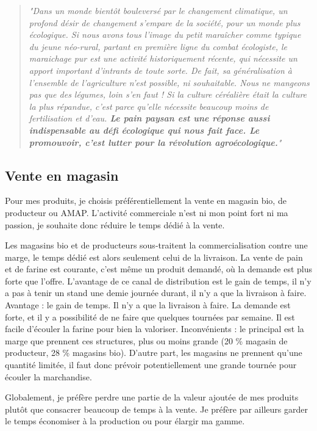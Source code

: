 \documentclass{book}
\begin{document}
\begin{quote}

\textit{"Dans un monde bientôt bouleversé par le changement climatique, un profond désir de changement s’empare de la société, pour un monde plus écologique. Si nous avons tous l’image du petit maraîcher comme typique du jeune néo-rural, partant en première ligne du combat écologiste, le maraichage pur est une activité historiquement récente, qui nécessite un apport important d’intrants de toute sorte. De fait, sa généralisation à l’ensemble de l’agriculture n’est possible, ni souhaitable. Nous ne mangeons pas que des légumes, loin s’en faut ! Si la culture céréalière était la culture la plus répandue, c’est parce qu’elle nécessite beaucoup moins de fertilisation et d’eau. \textbf{Le pain paysan est une réponse aussi indispensable au défi écologique qui nous fait face. Le promouvoir, c'est lutter pour la révolution agroécologique.}"}

\end{quote}

\subsection{Vente en magasin}

Pour mes produits, je choisis préférentiellement la vente en magasin bio, de producteur ou AMAP. L’activité commerciale n’est ni mon point fort ni ma passion, je souhaite donc réduire le temps dédié à la vente. 

Les magasins bio et de producteurs sous-traitent la commercialisation contre une marge, le temps dédié est alors seulement celui de la livraison. La vente de pain et de farine est courante, c’est même un produit demandé, où la demande est plus forte que l’offre. L’avantage de ce canal de distribution est le gain de temps, il n’y a pas à tenir un stand une demie journée durant, il n’y a que la livraison à faire. 
Avantage : le gain de temps. Il n’y a que la livraison à faire. La demande est forte, et il y a possibilité de ne faire que quelques tournées par semaine. Il est facile d’écouler la farine pour bien la valoriser. 
Inconvénients : le principal est la marge que prennent ces structures, plus ou moins grande (20 \% magasin de producteur, 28 \% magasins bio). D’autre part, les magasins ne prennent qu’une quantité limitée, il faut donc prévoir potentiellement une grande tournée pour écouler la marchandise.

Globalement, je préfère perdre une partie de la valeur ajoutée de mes produits plutôt que consacrer beaucoup de temps à la vente. Je préfère par ailleurs garder le temps économiser à la production ou pour élargir ma gamme. 
\end{document}
